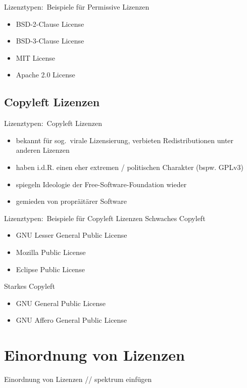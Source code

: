 \documentclass{beamer}
\begin{document}
\begin{frame}{Lizenztypen:\ Beispiele für Permissive Lizenzen}
	\begin{itemize}
		\item BSD-2-Clause License
		\item BSD-3-Clause License
		\item MIT License
		\item Apache 2.0 License
	\end{itemize}
\end{frame}

\subsection{Copyleft Lizenzen}
\begin{frame}{Lizenztypen:\ Copyleft Lizenzen}
	\begin{itemize}
		\item bekannt für sog.\ virale Lizensierung,
			verbieten Redistributionen unter anderen Lizenzen
		\item haben i.d.R. einen eher extremen / politischen Charakter (bspw. GPLv3)
		\item spiegeln Ideologie der Free-Software-Foundation wieder
		\item gemieden von propräitärer Software
	\end{itemize}
\end{frame}

\begin{frame}{Lizenztypen:\ Beispiele für Copyleft Lizenzen}
	Schwaches Copyleft
	\vspace{0.5em}
	\begin{itemize}
		\item GNU Lesser General Public License
		\item Mozilla Public License
		\item Eclipse Public License
	\end{itemize}
	\vspace{1em}

	Starkes Copyleft
	\vspace{0.5em}
	\begin{itemize}
		\item GNU General Public License
		\item GNU Affero General Public License
	\end{itemize}
\end{frame}

\section{Einordnung von Lizenzen}
\begin{frame}{Einordnung von Lizenzen}
	// spektrum einfügen
\end{frame}
\end{document}
